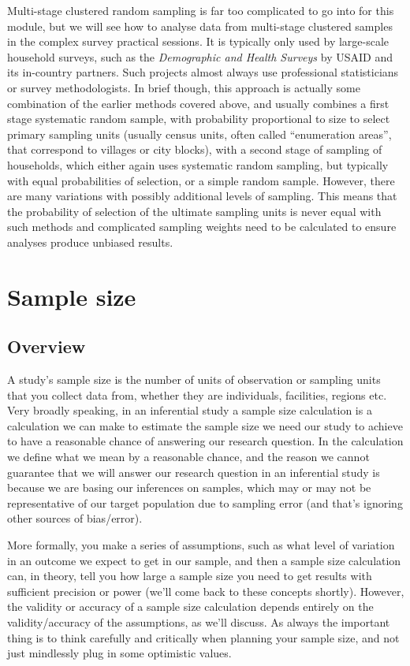 \documentclass[
]{book}
\begin{document}
Multi-stage clustered random sampling is far too complicated to go into for this module, but we will see how to analyse data from multi-stage clustered samples in the complex survey practical sessions. It is typically only used by large-scale household surveys, such as the \emph{Demographic and Health Surveys} by USAID and its in-country partners. Such projects almost always use professional statisticians or survey methodologists. In brief though, this approach is actually some combination of the earlier methods covered above, and usually combines a first stage systematic random sample, with probability proportional to size to select primary sampling units (usually census units, often called ``enumeration areas'', that correspond to villages or city blocks), with a second stage of sampling of households, which either again uses systematic random sampling, but typically with equal probabilities of selection, or a simple random sample. However, there are many variations with possibly additional levels of sampling. This means that the probability of selection of the ultimate sampling units is never equal with such methods and complicated sampling weights need to be calculated to ensure analyses produce unbiased results.

\hypertarget{sample-size}{%
\chapter{Sample size}\label{sample-size}}

\hypertarget{overview-4}{%
\section{Overview}\label{overview-4}}

A study's sample size is the number of units of observation or sampling units that you collect data from, whether they are individuals, facilities, regions etc. Very broadly speaking, in an inferential study a sample size calculation is a calculation we can make to estimate the sample size we need our study to achieve to have a reasonable chance of answering our research question. In the calculation we define what we mean by a reasonable chance, and the reason we cannot guarantee that we will answer our research question in an inferential study is because we are basing our inferences on samples, which may or may not be representative of our target population due to sampling error (and that's ignoring other sources of bias/error).

More formally, you make a series of assumptions, such as what level of variation in an outcome we expect to get in our sample, and then a sample size calculation can, in theory, tell you how large a sample size you need to get results with sufficient precision or power (we'll come back to these concepts shortly). However, the validity or accuracy of a sample size calculation depends entirely on the validity/accuracy of the assumptions, as we'll discuss. As always the important thing is to think carefully and critically when planning your sample size, and not just mindlessly plug in some optimistic values.
\end{document}

